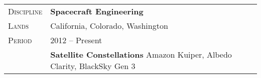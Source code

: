 \documentclass[a4paper, oneside, final]{scrartcl}
\newcommand{\gray}{\rowcolor[gray]{.90}} %
\begin{document}
\begin{center}

\begin{tabularx}{0.97\linewidth}{>{\raggedleft\scshape}p{2cm}X}
\gray Discipline & \textbf{Spacecraft Engineering}\\
\gray Lands & California, Colorado, Washington \hfill \\
\gray Period & 2012 -- Present\\
&
\vspace{-0.15 cm}
 \textbf{Satellite Constellations}
 \newline
Amazon Kuiper, Albedo Clarity, BlackSky Gen 3
\\
\end{tabularx}



\end{center}
\end{document}
